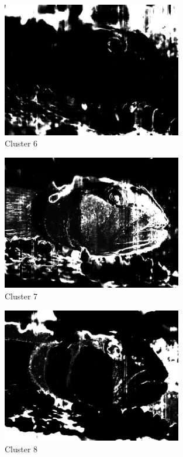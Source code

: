 \documentclass{article}      %
\begin{document}
\begin{figure}[H]
\centering
\includegraphics[width=0.7\textwidth]{partb_wts_cluster5}
\caption{Cluster 6}
\end{figure}

\begin{figure}[H]
\centering
\includegraphics[width=0.7\textwidth]{partb_wts_cluster6}
\caption{Cluster 7}
\end{figure}

\begin{figure}[H]
\centering
\includegraphics[width=0.7\textwidth]{partb_wts_cluster7}
\caption{Cluster 8}
\end{figure}
\end{document}
